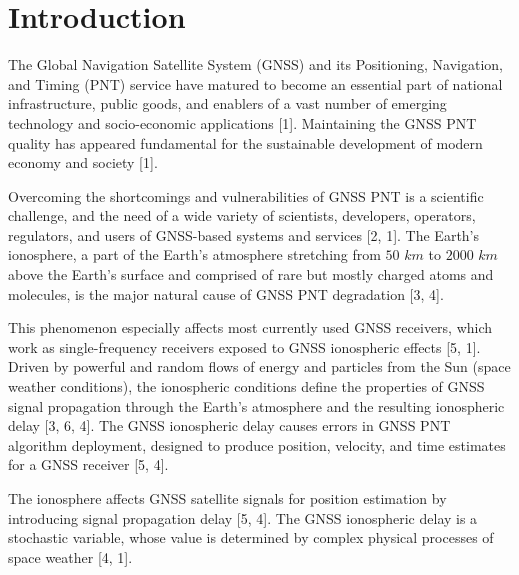 \documentclass[sn-mathphys-num]{sn-jnl}%
\begin{document}



\maketitle

\section{Introduction}

The Global Navigation Satellite System (GNSS) and its Positioning, Navigation, and Timing (PNT) service have matured to become an essential part of national infrastructure, public goods, and enablers of a vast number of emerging technology and socio-economic applications [1]. Maintaining the GNSS PNT quality has appeared fundamental for the sustainable development of modern economy and society [1]. 

Overcoming the shortcomings and vulnerabilities of GNSS PNT is a scientific challenge, and the need of a wide variety of scientists, developers, operators, regulators, and users of GNSS-based systems and services [2, 1]. The Earth’s ionosphere, a part of the Earth’s atmosphere stretching from $50$ $km$ to $2000$ $km$ above the Earth’s surface and comprised of rare but mostly charged atoms and molecules, is the major natural cause of GNSS PNT degradation [3, 4]. 

This phenomenon especially affects most currently used GNSS receivers, which work as single-frequency receivers exposed to GNSS ionospheric effects [5, 1]. Driven by powerful and random flows of energy and particles from the Sun (space weather conditions), the ionospheric conditions define the properties of GNSS signal propagation through the Earth’s atmosphere and the resulting ionospheric delay [3, 6, 4]. The GNSS ionospheric delay causes errors in GNSS PNT algorithm deployment, designed to produce position, velocity, and time estimates for a GNSS receiver [5, 4]. 

The ionosphere affects GNSS satellite signals for position estimation by introducing signal propagation delay [5, 4]. The GNSS ionospheric delay is a stochastic variable, whose value is determined by complex physical processes of space weather [4, 1].
\end{document}
